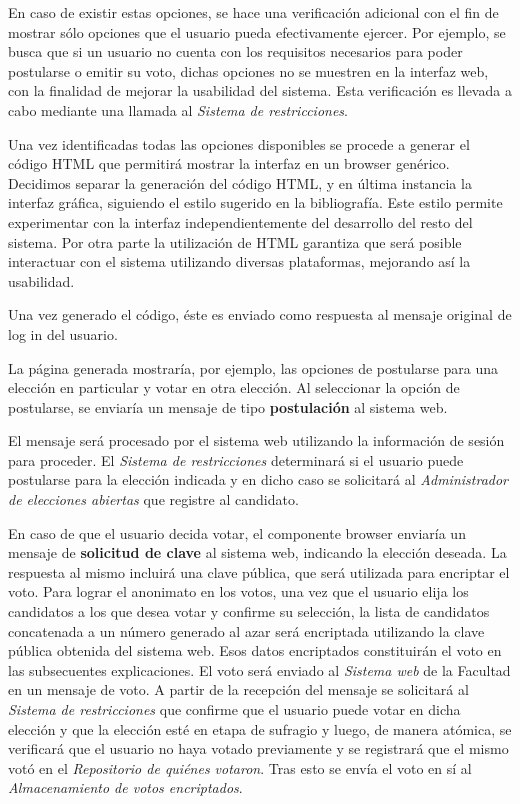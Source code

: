 En caso de existir estas opciones, se hace una verificación adicional con el fin de mostrar sólo opciones que el usuario pueda efectivamente ejercer.  
Por ejemplo, se busca que si un usuario no cuenta con los requisitos necesarios para poder postularse o emitir su voto, dichas opciones no se muestren en la interfaz web, con la finalidad de mejorar la usabilidad del sistema. 
Esta verificación es llevada a cabo mediante una llamada al \emph{Sistema de restricciones}.

Una vez identificadas todas las opciones disponibles se procede a generar el código HTML que permitirá mostrar la interfaz en un browser genérico. 
Decidimos separar la generación del código HTML, y en última instancia la interfaz gráfica, siguiendo el estilo sugerido en la bibliografía. 
Este estilo permite experimentar con la interfaz independientemente del desarrollo del resto del sistema. 
Por otra parte la utilización de HTML garantiza que será posible interactuar con el sistema utilizando diversas plataformas, mejorando así la usabilidad.


Una vez generado el código, éste es enviado como respuesta al mensaje original de log in del usuario. 

La página generada mostraría, por ejemplo, las opciones de postularse para una elección en particular y votar en otra elección. Al seleccionar la opción de postularse, se enviaría un mensaje de tipo {\bf postulación} al sistema web. 

El mensaje será procesado por el sistema web utilizando la información de sesión para proceder. 
El \emph{Sistema de restricciones} determinará si el usuario puede postularse para la elección indicada y en dicho caso se solicitará al \emph{Administrador de elecciones abiertas} que registre al candidato. 


En caso de que el usuario decida votar, el componente browser enviaría un mensaje de {\bf solicitud de clave} al sistema web, indicando la elección deseada. 
La respuesta al mismo incluirá una clave pública, que será utilizada para encriptar el voto. 
Para lograr el anonimato en los votos, una vez que el usuario elija los candidatos a los que desea votar y confirme su selección, la lista de candidatos concatenada a un número generado al azar será encriptada utilizando la clave pública obtenida del sistema web. 
Esos datos encriptados constituirán el voto en las subsecuentes explicaciones. 
El voto será enviado al \emph{Sistema web} de la Facultad en un mensaje de voto. 
A partir de la recepción del mensaje se solicitará al \emph{Sistema de restricciones} que confirme que el usuario puede votar en dicha elección y que la elección esté en etapa de sufragio y luego, de manera atómica, se verificará que el usuario no haya votado previamente y se registrará que el mismo votó en el \emph{Repositorio de quiénes votaron}. 
Tras esto se envía el voto en sí al \emph{Almacenamiento de votos encriptados}.

